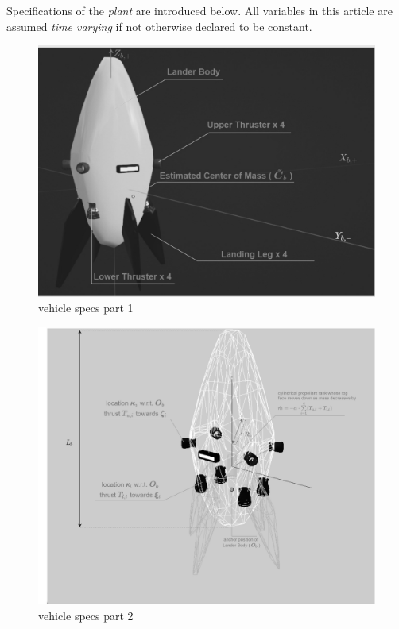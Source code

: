 \documentclass[10pt]{elsarticle}
\begin{document}
Specifications of the \textit{plant} are introduced below. All variables in this article are assumed \textit{time varying} if not otherwise declared to be constant.

\begin{figure}[!htb]
    \centering
    \includegraphics[width=.9\textwidth, keepaspectratio]{plant_geometry_2}
    \vspace*{2mm}
    \caption{vehicle specs part 1}
    \label{fig:plant_geometry_2}
\end{figure}

\begin{figure}[!htb]
    \centering
    \includegraphics[width=.9\textwidth, keepaspectratio]{plant_geometry_3}
    \vspace*{2mm}
    \caption{vehicle specs part 2}
    \label{fig:plant_geometry_3}
\end{figure}
\end{document}

